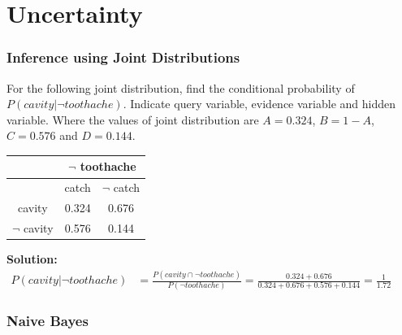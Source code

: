 \chapter{Uncertainty}

\subsection*{Inference using Joint Distributions}

For the following joint distribution, find the conditional probability of
$P(cavity | \neg toothache)$. Indicate query variable, evidence variable and hidden variable. Where the values of joint distribution are $A = 0.324$, $B=1-A$, $C = 0.576$ and $D = 0.144$.

\begin{center}
   \begin{tabularx}{0.5\textwidth}{|C|C|C|}\hline
      & 
      \\\hline
      & catch & $\neg$ catch
      \\\hline
      cavity & 0.324 & 0.676
      \\\hline
      $\neg$ cavity & 0.576 & 0.144
      \\\hline
   \end{tabularx}
\end{center}

\textbf{Solution:}\\[0.5em]

$\begin{aligned}
   P(cavity | \neg toothache) &= \frac{P(cavity \cap \neg toothache)}{P(\neg toothache)} = \frac{0.324+0.676}{0.324+0.676+0.576+0.144} = \frac{1}{1.72}
\end{aligned}$


\subsection*{Naive Bayes}


